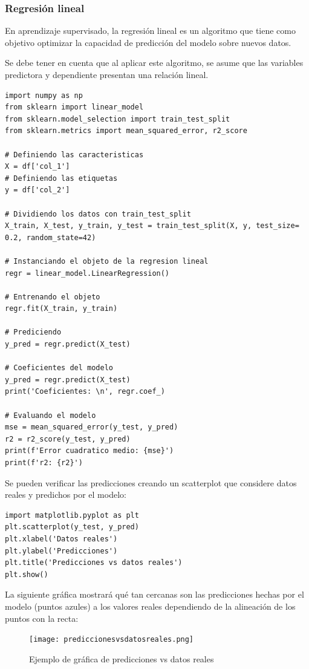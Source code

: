 \documentclass[a4paper, 12pt]{book}
\begin{document}
\subsubsection{Regresión lineal}
En aprendizaje supervisado, la regresión lineal es un algoritmo que tiene como objetivo optimizar la capacidad de predicción del modelo sobre nuevos datos.

Se debe tener en cuenta que al aplicar este algoritmo, se asume que las variables predictora y dependiente presentan una relación lineal.

\begin{verbatim}
import numpy as np
from sklearn import linear_model
from sklearn.model_selection import train_test_split
from sklearn.metrics import mean_squared_error, r2_score

# Definiendo las caracteristicas
X = df['col_1']
# Definiendo las etiquetas
y = df['col_2']

# Dividiendo los datos con train_test_split
X_train, X_test, y_train, y_test = train_test_split(X, y, test_size= 0.2, random_state=42)

# Instanciando el objeto de la regresion lineal
regr = linear_model.LinearRegression()

# Entrenando el objeto
regr.fit(X_train, y_train)

# Prediciendo
y_pred = regr.predict(X_test)

# Coeficientes del modelo
y_pred = regr.predict(X_test)
print('Coeficientes: \n', regr.coef_)

# Evaluando el modelo
mse = mean_squared_error(y_test, y_pred)
r2 = r2_score(y_test, y_pred)
print(f'Error cuadratico medio: {mse}')
print(f'r2: {r2}')
\end{verbatim}

Se pueden verificar las predicciones creando un scatterplot que considere datos reales y predichos por el modelo:
\begin{verbatim}
import matplotlib.pyplot as plt
plt.scatterplot(y_test, y_pred)
plt.xlabel('Datos reales')
plt.ylabel('Predicciones')
plt.title('Predicciones vs datos reales')
plt.show()
\end{verbatim}
La siguiente gráfica mostrará qué tan cercanas son las predicciones hechas por el modelo (puntos azules) a los valores reales dependiendo de la alineación de los puntos con la recta:

\begin{figure}[H]
	\centering
	\texttt{[image: prediccionesvsdatosreales.png]}
	\caption{Ejemplo de gráfica de predicciones vs datos reales}
\end{figure}
\end{document}
